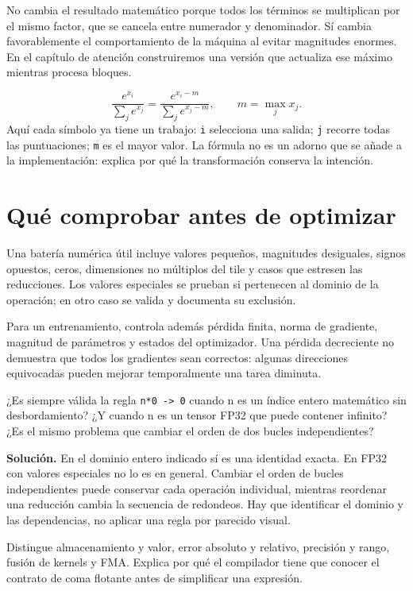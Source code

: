 \documentclass[12pt,a4paper,oneside]{report}
\begin{document}
No cambia el resultado matemático porque todos los términos se multiplican por el mismo factor, que se cancela entre numerador y denominador. Sí cambia favorablemente el comportamiento de la máquina al evitar magnitudes enormes. En el capítulo de atención construiremos una versión que actualiza ese máximo mientras procesa bloques.

\[
\frac{e^{x_i}}{\sum_j e^{x_j}}
=\frac{e^{x_i-m}}{\sum_j e^{x_j-m}},\qquad m=\max_j x_j.
\]
Aquí cada símbolo ya tiene un trabajo: \texttt{i} selecciona una salida; \texttt{j} recorre todas las puntuaciones; \texttt{m} es el mayor valor. La fórmula no es un adorno que se añade a la implementación: explica por qué la transformación conserva la intención.

\section{Qué comprobar antes de optimizar}
Una batería numérica útil incluye valores pequeños, magnitudes desiguales, signos opuestos, ceros, dimensiones no múltiplos del tile y casos que estresen las reducciones. Los valores especiales se prueban si pertenecen al dominio de la operación; en otro caso se valida y documenta su exclusión.

Para un entrenamiento, controla además pérdida finita, norma de gradiente, magnitud de parámetros y estados del optimizador. Una pérdida decreciente no demuestra que todos los gradientes sean correctos: algunas direcciones equivocadas pueden mejorar temporalmente una tarea diminuta.

\begin{practica}
¿Es siempre válida la regla \texttt{n*0 -> 0} cuando n es un índice entero matemático sin desbordamiento? ¿Y cuando n es un tensor FP32 que puede contener infinito? ¿Es el mismo problema que cambiar el orden de dos bucles independientes?

\end{practica}
\textbf{Solución.} En el dominio entero indicado sí es una identidad exacta. En FP32 con valores especiales no lo es en general. Cambiar el orden de bucles independientes puede conservar cada operación individual, mientras reordenar una reducción cambia la secuencia de redondeos. Hay que identificar el dominio y las dependencias, no aplicar una regla por parecido visual.

\begin{comprueba}
Distingue almacenamiento y valor, error absoluto y relativo, precisión y rango, fusión de kernels y FMA. Explica por qué el compilador tiene que conocer el contrato de coma flotante antes de simplificar una expresión.

\end{comprueba}
\end{document}

